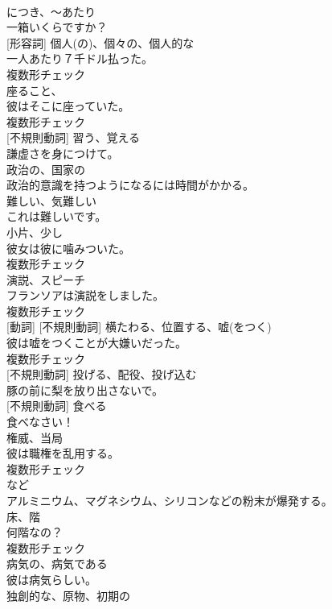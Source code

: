 \documentclass[8pt]{extreport}
\begin{document}
\begin{CJK}{UTF8}{min}
\\	[前置詞]	につき、〜あたり	
\\	一箱いくらですか？	
\\	[名詞] [形容詞]	個人(の)、個々の、個人的な	
\\	一人あたり７千ドル払った。	
\\	複数形チェック
\\	[名詞]	座ること、	
\\	彼はそこに座っていた。	
\\	複数形チェック
\\	[動詞] [不規則動詞]	習う、覚える	
\\	謙虚さを身につけて。	
\\	[形容詞]	政治の、国家の	
\\	政治的意識を持つようになるには時間がかかる。	
\\	[形容詞]	難しい、気難しい	
\\	これは難しいです。	
\\	[名詞]	小片、少し	
\\	彼女は彼に噛みついた。	
\\	複数形チェック
\\	[名詞]	演説、スピーチ	
\\	フランソアは演説をしました。	
\\	複数形チェック
\\	[名詞] [動詞] [不規則動詞]	横たわる、位置する、嘘(をつく)	
\\	彼は嘘をつくことが大嫌いだった。	
\\	複数形チェック
\\	[動詞] [不規則動詞]	投げる、配役、投げ込む	
\\	豚の前に梨を放り出さないで。	
\\	[動詞] [不規則動詞]	食べる	
\\	食べなさい！	
\\	[名詞]	権威、当局	
\\	彼は職権を乱用する。	
\\	複数形チェック
\\	[副詞]	など	
\\	アルミニウム、マグネシウム、シリコンなどの粉末が爆発する。	
\\	[名詞]	床、階	
\\	何階なの？	
\\	複数形チェック
\\	[形容詞]	病気の、病気である	
\\	彼は病気らしい。	
\\	[形容詞]	独創的な、原物、初期の	

\end{CJK}
\end{document}
